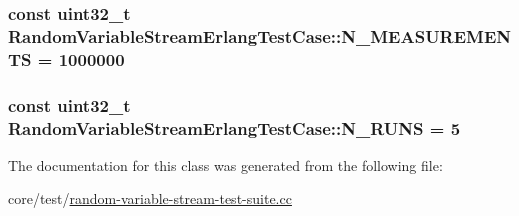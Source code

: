 \subsubsection[{\texorpdfstring{N\+\_\+\+M\+E\+A\+S\+U\+R\+E\+M\+E\+N\+TS}{N_MEASUREMENTS}}]{\setlength{\rightskip}{0pt plus 5cm}const uint32\+\_\+t Random\+Variable\+Stream\+Erlang\+Test\+Case\+::\+N\+\_\+\+M\+E\+A\+S\+U\+R\+E\+M\+E\+N\+TS = 1000000\hspace{0.3cm}{\ttfamily [static]}}\hypertarget{classRandomVariableStreamErlangTestCase_a317b0f6b963f81bfb4b5a6962443b0e1}{}\label{classRandomVariableStreamErlangTestCase_a317b0f6b963f81bfb4b5a6962443b0e1}
\subsubsection[{\texorpdfstring{N\+\_\+\+R\+U\+NS}{N_RUNS}}]{\setlength{\rightskip}{0pt plus 5cm}const uint32\+\_\+t Random\+Variable\+Stream\+Erlang\+Test\+Case\+::\+N\+\_\+\+R\+U\+NS = 5\hspace{0.3cm}{\ttfamily [static]}}\hypertarget{classRandomVariableStreamErlangTestCase_a7d2faa7dc4abace14dd2bf99a2f1d643}{}\label{classRandomVariableStreamErlangTestCase_a7d2faa7dc4abace14dd2bf99a2f1d643}


The documentation for this class was generated from the following file\+:\begin{DoxyCompactItemize}
\item 
core/test/\hyperlink{random-variable-stream-test-suite_8cc}{random-\/variable-\/stream-\/test-\/suite.\+cc}\end{DoxyCompactItemize}
